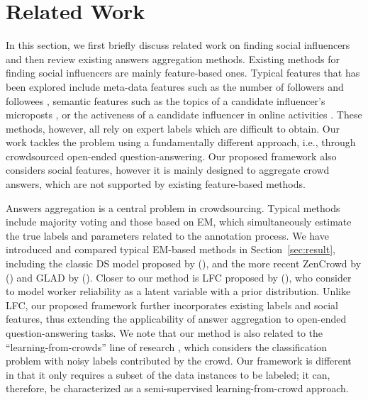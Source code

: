 \section{Related Work}

In this section, we first briefly discuss related work on finding social influencers and then review existing answers aggregation methods. Existing methods for finding social influencers are mainly feature-based ones. Typical features that has been explored include meta-data features such as the number of followers and followees \cite{Lehmann2013,Cheng2014}, semantic features such as the topics of a candidate influencer's microposts \cite{riahi2012finding,wei2016learning}, or the activeness of a candidate influencer in online activities \cite{agarwal2008identifying,Lehmann2013}. These methods, however, all rely on expert labels which are difficult to obtain. Our work tackles the problem using a fundamentally different approach, i.e., through crowdsourced open-ended question-answering. Our proposed framework also considers social features, however it is mainly designed to aggregate crowd answers, which are not supported by existing feature-based methods.


Answers aggregation is a central problem in crowdsourcing. Typical methods include majority voting \cite{sheng2008get} and those based on EM, which simultaneously estimate the true labels and parameters related to the annotation process. We have introduced and compared typical EM-based methods in Section~\ref{sec:result}, including the classic DS model proposed by \citeauthor{dawid1979maximum} (\citeyear{dawid1979maximum}), and the more recent ZenCrowd by \citeauthor{demartini2012zencrowd} (\citeyear{demartini2012zencrowd}) and GLAD by \citeauthor{whitehill2009whose} (\citeyear{whitehill2009whose}). Closer to our method is LFC proposed by \citeauthor{raykar2010learning} (\citeyear{raykar2010learning}), who consider to model worker reliability as a latent variable with a prior distribution. Unlike LFC, our proposed framework further incorporates existing labels and social features, thus extending the applicability of answer aggregation to open-ended question-answering tasks. We note that our method is also related to the ``learning-from-crowds'' line of research \cite{raykar2010learning,tian2012learning,yang2018leveraging}, which considers the classification problem with noisy labels contributed by the crowd. Our framework is different in that it only requires a subset of the data instances to be labeled; it can, therefore, be characterized as a semi-supervised learning-from-crowd approach. 